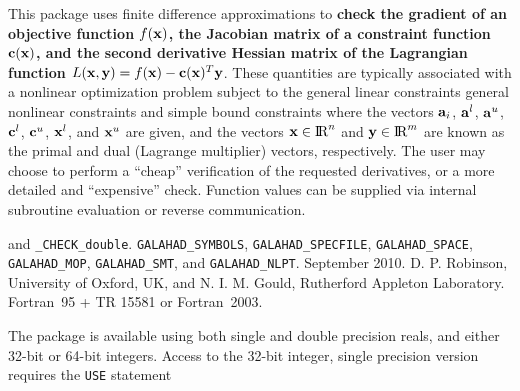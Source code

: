 \documentclass{galahad}
\newcommand{\packagename}{CHECK}
\newcommand{\fullpackagename}{\libraryname\_\packagename}
\begin{document}
\galheader


\galsummary
This package uses finite difference approximations to {\bf check the gradient of an objective
  function $f({\mathbf{x}})$, the Jacobian matrix of a constraint function ${\mathbf{c}}({\mathbf{x}})$, and the
  second derivative Hessian matrix of the Lagrangian function $L({\mathbf{x}},{\mathbf{y}}) = f({\mathbf{x}}) -
  {\mathbf{c}}({\mathbf{x}})^T {\mathbf{y}}$}.  These quantities are typically associated with a nonlinear
optimization problem
subject to the general linear constraints
general nonlinear constraints
and simple bound constraints
where the vectors ${\mathbf{a}}_{i}$, ${\mathbf{a}}^{l}$, ${\mathbf{a}}^{u}$, ${\mathbf{c}}^{l}$,
${\mathbf{c}}^{u}$, ${\mathbf{x}}^{l}$, and ${\mathbf{x}}^{u}$ are given, and the vectors
${\mathbf{x}}\in\hbox{I\hskip -1.5pt R}^n$ and ${\mathbf{y}}\in\hbox{I\hskip -1.5pt R}^m$ are known as the primal and dual (Lagrange
multiplier) vectors, respectively.  The user may choose to perform a ``cheap''
verification of the requested derivatives, or a more detailed
and ``expensive'' check.  Function values can be supplied via internal
subroutine evaluation or reverse communication.


\galattributes
\galversions{\tt  \fullpackagename\_single} and {\tt \fullpackagename\_double}.
\galuses 
{\tt GALAHAD\_SY\-M\-BOLS},
{\tt GAL\-AHAD\_SPECFILE},
{\tt GALAHAD\_SPACE},
{\tt GALAHAD\_MOP},
{\tt GALAHAD\_SMT}, and
{\tt GALAHAD\_NLPT}.
\galdate September 2010.
\galorigin D. P. Robinson, University of Oxford, UK, and
N. I. M. Gould, Rutherford Appleton Laboratory.
\gallanguage Fortran~95 + TR 15581 or Fortran~2003. 


\galhowto


The package is available using both single and double precision reals, 
and either 32-bit or 64-bit integers. Access to the 32-bit integer,
single precision version requires the {\tt USE} statement
\medskip
\end{document}
